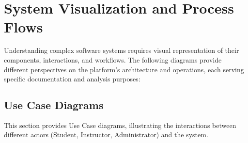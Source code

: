 \documentclass[12pt,a4paper]{article}
\begin{document}
\section{System Visualization and Process Flows}

Understanding complex software systems requires visual representation of their components, interactions, and workflows. The following diagrams provide different perspectives on the platform's architecture and operations, each serving specific documentation and analysis purposes:

\subsection{Use Case Diagrams}

This section provides Use Case diagrams, illustrating the interactions between different actors (Student, Instructor, Administrator) and the system.
\end{document}
